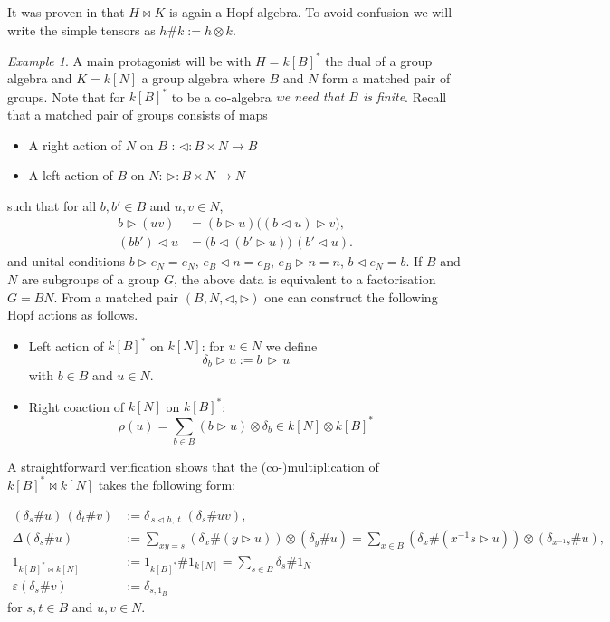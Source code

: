 \documentclass[a4paper,10pt]{amsart}
\theoremstyle{definition}
\theoremstyle{remark}
\newtheorem{example}[lemma]{Example}
\newcommand\D{\Delta}
\newcommand\eps{\varepsilon}
\newcommand\triangler{\triangleright}
\newcommand\trianglel{\triangleleft}
\newcommand\ot{\otimes}
\begin{document}
It was proven in \cite{Takeuchi} that $H \bowtie K$ is again a Hopf algebra. To avoid confusion we will write the simple tensors as $h \# k := h \ot k.$


\begin{example}\label{example matched pair groups}
A main protagonist will be with  $H = k[B]^*$ the dual of a group algebra and $K= k[N]$ a group algebra where $B$ and $N$ form a matched pair of groups. Note that for $k[B]^*$ to be a co-algebra \emph{we need that $B$ is finite}. Recall that a matched pair of groups consists of maps
\begin{itemize}
\item  A right action of $N$ on $B$ : $\triangleleft: B\times N\to B$
\item A left action of $B$ on $N$: $\triangleright: B\times N\to N$
\end{itemize}
such that for all $b,b'\in B$ and $u,v\in N$,
\begin{align}
b\triangler (uv) &= (b\triangler u)\bigl((b\trianglel u)\triangler v\bigr),\label{eq:grpMP1}\\
(bb')\trianglel u &= \bigl(b\trianglel (b'\triangler u)\bigr)\,(b'\trianglel u).\label{eq:grpMP2}
\end{align}
and unital conditions $b\triangleright e_N=e_N$, $e_B\triangleleft n=e_B$, $e_B\triangleright n=n$, $b\triangleleft e_N=b$.
If $B$ and $N$ are subgroups of a group $G$, the above data is equivalent to a factorisation $G=BN$. From a matched pair $(B,N,\triangleleft,\triangleright)$ one can construct the following Hopf actions as follows.

\begin{itemize}
\item Left action of $k[B]^*$ on $k[N]$: for $u\in N$ we define 
$$
\delta_b\triangler u := b \, \triangler \,u$$ 
with $b \in B$ and $u \in N$. 

\item Right coaction of $k[N]$ on $k[B]^*$:
$$
\rho(u) = \sum_{b\in B} (b \triangler u) \ot \delta_b \in k[N] \ot k[B]^*
$$
\end{itemize}

A straightforward verification shows that the (co-)multiplication of $k[B]^*\bowtie k[N]$ takes the following form:

\begin{align*}
(\delta_s\# u)\,(\delta_t\# v)
&:=\delta_{\,s\trianglel h,\ t}\;(\delta_s\# uv),\\
\D (\delta_s\# u)
&:=\sum_{xy=s} (\delta_x\# (y\triangler u)) \otimes (\delta_y\# u) = \sum_{x \in B} (\delta_x\# (x^{-1}s\triangler u)) \otimes (\delta_{x^{-1}s}\# u), \\
1_{k[B]^*\bowtie k[N]}&:= 1_{k[B]^*} \# 1_{k[N]}= \sum_{s\in B}\delta_s\# 1_N \\
\eps (\delta_s\# v)&:=\delta_{s,1_B}
\end{align*}
for $s,t \in B$ and $u,v \in N$.
\end{example}
\end{document}
